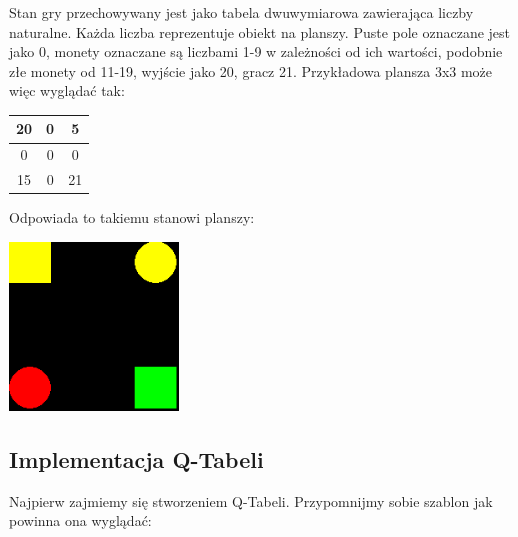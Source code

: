 \documentclass[a4paper,12pt]{article}
\begin{document}
Stan gry przechowywany jest jako tabela dwuwymiarowa zawierająca liczby naturalne. Każda liczba reprezentuje obiekt na planszy. Puste pole oznaczane jest jako 0, monety oznaczane są liczbami 1-9 w zależności od ich wartości, podobnie złe monety od 11-19, wyjście jako 20, gracz 21. Przykładowa plansza 3x3 może więc wyglądać tak:

\begin{center}
\begin{tabular}{ |c|c|c| }
\hline
20 & 0 & 5 \\
\hline
0 & 0 & 0 \\
\hline
15 & 0 & 21 \\
\hline
\end{tabular}
\newline
\end{center} 

Odpowiada to takiemu stanowi planszy:

\includegraphics[width=45mm]{przyklad3.png}

\subsection{Implementacja Q-Tabeli}

Najpierw zajmiemy się stworzeniem Q-Tabeli. Przypomnijmy sobie szablon jak powinna ona wyglądać:
\end{document}

